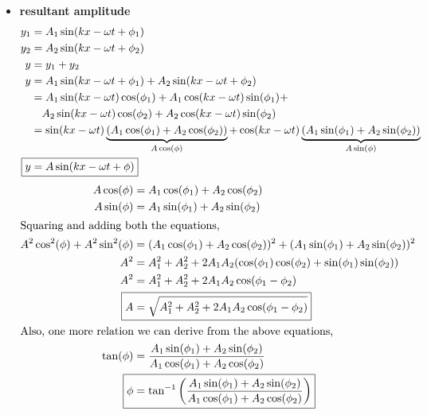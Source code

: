 \documentclass[11pt]{article}
\begin{document}
\begin{itemize}
    \begin{itemize}
        \item \textbf{resultant amplitude}
        \begin{align*}
            y_1 &= A_1 \sin(kx-\omega t + \phi_1)\\
            y_2 &= A_2 \sin(kx-\omega t + \phi_2)\\
            y &= y_1 + y_2\\
            y &= A_1 \sin(kx-\omega t + \phi_1) + A_2 \sin(kx-\omega t + \phi_2)\\
                &= A_1 \sin(kx-\omega t) \cos(\phi_1) + A_1 \cos(kx-\omega t) \sin(\phi_1) + \\ &\quad A_2 \sin(kx-\omega t) \cos(\phi_2) + A_2 \cos(kx-\omega t) \sin(\phi_2)\\
                &= \sin(kx-\omega t) \underbrace{(A_1 \cos(\phi_1) + A_2 \cos(\phi_2))}_{A\cos(\phi)} + \cos(kx-\omega t) \underbrace{(A_1 \sin(\phi_1) + A_2 \sin(\phi_2))}_{A\sin(\phi)}\\
              \Aboxed{y  &= A \sin(kx-\omega t + \phi)}\\
        \end{align*}
        \begin{align*}
            A\cos(\phi) &= A_1 \cos(\phi_1) + A_2 \cos(\phi_2)\\
            A\sin(\phi) &= A_1 \sin(\phi_1) + A_2 \sin(\phi_2)\\
            \intertext{Squaring and adding both the equations,}
            A^2\cos^2(\phi) + A^2\sin^2(\phi) &= (A_1 \cos(\phi_1) + A_2 \cos(\phi_2))^2 + (A_1 \sin(\phi_1) + A_2 \sin(\phi_2))^2\\
            A^2 &= A_1^2 + A_2^2 + 2A_1A_2(\cos(\phi_1)\cos(\phi_2) + \sin(\phi_1)\sin(\phi_2))\\
            A^2 &= A_1^2 + A_2^2 + 2A_1A_2\cos(\phi_1 - \phi_2)\\
            \Aboxed{A &= \sqrt{A_1^2 + A_2^2 + 2A_1A_2\cos(\phi_1 - \phi_2)}}\\
            \intertext{Also, one more relation we can derive from the above equations,}
            \tan(\phi) &= \frac{A_1 \sin(\phi_1) + A_2 \sin(\phi_2)}{A_1 \cos(\phi_1) + A_2 \cos(\phi_2)}\\
            \Aboxed{\phi &= \tan^{-1}\left(\frac{A_1 \sin(\phi_1) + A_2 \sin(\phi_2)}{A_1 \cos(\phi_1) + A_2 \cos(\phi_2)}\right)}\\
        \end{align*}
        \begin{center}

\end{center}
\end{itemize}
\end{itemize}
\end{document}
